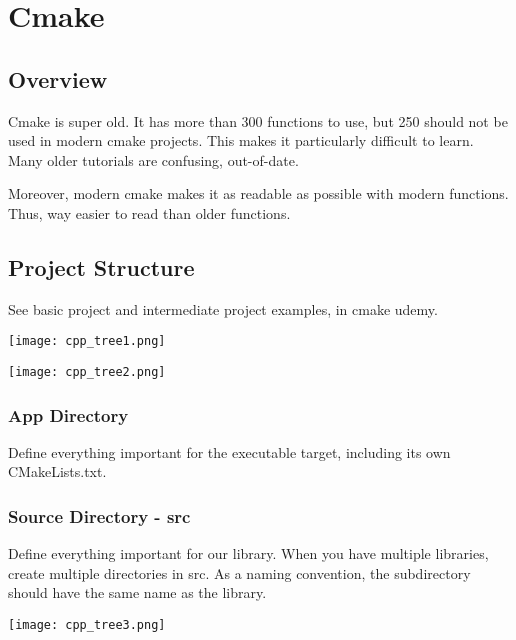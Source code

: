 \chapter{Cmake}

\section{Overview}

Cmake is super old. It has more than 300 functions to use, but 250 should not be used in modern cmake projects. 
This makes it particularly difficult to learn. Many older tutorials are confusing, out-of-date.

Moreover, modern cmake makes it as readable as possible with modern functions. Thus, way easier to read than older
functions.

\section{Project Structure}

See basic project and intermediate project examples, in cmake udemy.

\begin{center}
    \texttt{[image: cpp\_tree1.png]}
\end{center}


\begin{center}
    \texttt{[image: cpp\_tree2.png]}
\end{center}

\subsection{App Directory}

Define everything important for the executable target, including its own CMakeLists.txt.

\subsection{Source Directory - src}

Define everything important for our library. When you have multiple libraries, create multiple directories in
src. As a naming convention, the subdirectory should have the same name as the library.

\begin{center}
    \texttt{[image: cpp\_tree3.png]}
\end{center}

